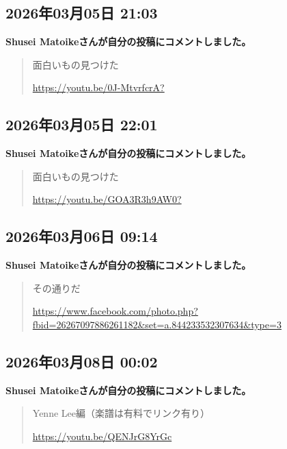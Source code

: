 \subsection*{2026年03月05日 21:03}

\textbf{Shusei Matoikeさんが自分の投稿にコメントしました。}

\begin{quote}
面白いもの見つけた

\url{https://youtu.be/0J-MtvrfcrA?}
\end{quote}

\subsection*{2026年03月05日 22:01}

\textbf{Shusei Matoikeさんが自分の投稿にコメントしました。}

\begin{quote}
面白いもの見つけた

\url{https://youtu.be/GOA3R3h9AW0?}
\end{quote}

\subsection*{2026年03月06日 09:14}

\textbf{Shusei Matoikeさんが自分の投稿にコメントしました。}

\begin{quote}
その通りだ

\url{https://www.facebook.com/photo.php?fbid=26267097886261182&set=a.844233532307634&type=3}
\end{quote}

\subsection*{2026年03月08日 00:02}

\textbf{Shusei Matoikeさんが自分の投稿にコメントしました。}

\begin{quote}
Yenne Lee編（楽譜は有料でリンク有り）

\url{https://youtu.be/QENJrG8YrGc}
\end{quote}

